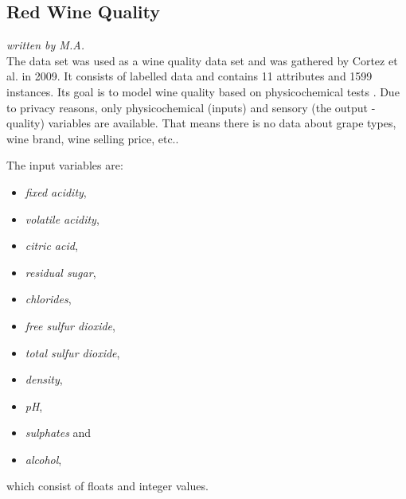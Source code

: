 \subsection{Red Wine Quality}
\textit{written by M.A.}\\

The data set was used as a wine quality data set and was gathered by Cortez et al. in 2009. It consists of labelled data and contains 11 attributes and 1599 instances. Its goal is to model wine quality based on physicochemical tests \cite{cortez2009modeling}. Due to privacy reasons, only physicochemical (inputs) and sensory (the output - quality) variables are available. That means there is no data about grape types, wine brand, wine selling price, etc..\newline

The input variables are: 
\begin{multicols}{2}
\begin{itemize}
    \item \textit {fixed acidity},
    \item \textit {volatile acidity}, 
    \item \textit {citric acid}, 
    \item \textit {residual sugar},
    \item \textit {chlorides}, 
    \item \textit {free sulfur dioxide}, 
    \item \textit {total sulfur dioxide},
    \item \textit {density}, 
    \item \textit {pH},
    \item \textit {sulphates} and 
    \item \textit {alcohol},
\end{itemize} 
\end{multicols}

which consist of floats and integer values.   \newline

